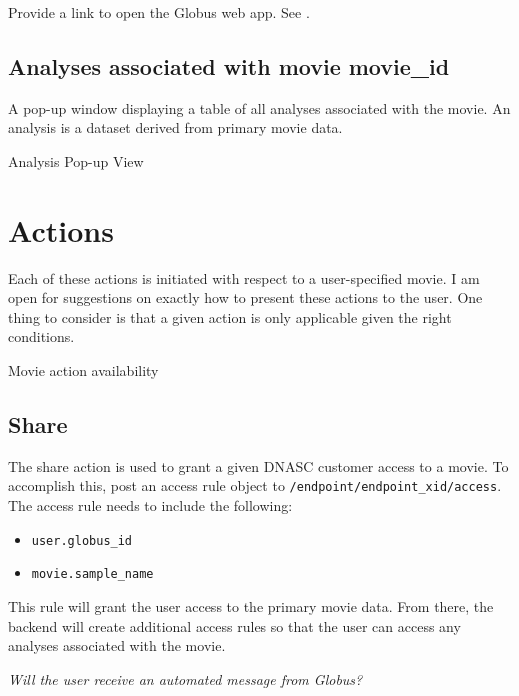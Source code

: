 Provide a link to open the Globus web app. See .

\subsection{Analyses associated with movie movie\_id}

A pop-up window displaying a table of all analyses associated with the movie. An analysis 
is a dataset derived from primary movie data.

\begin{table}[h]
    
    \caption{Analysis Pop-up View}
\end{table}

\section{Actions}

Each of these actions is initiated with respect to a user-specified movie. I am open for 
suggestions on exactly how to present these actions to the user. One thing to consider is 
that a given action is only applicable given the right conditions.

\begin{table}[h]
    
    \caption{Movie action availability}
\end{table}

\subsection{Share}

The share action is used to grant a given DNASC customer access to a movie. To accomplish 
this, post an access rule object to \texttt{/endpoint/endpoint\_xid/access}. The access rule 
needs to include the following:

\begin{itemize}
    \item \texttt{user.globus\_id}
    \item \texttt{movie.sample\_name}
\end{itemize}

This rule will grant the user access to the primary movie data. From there, the backend will 
create additional access rules so that the user can access any analyses associated with the 
movie.

\emph{Will the user receive an automated message from Globus?}

